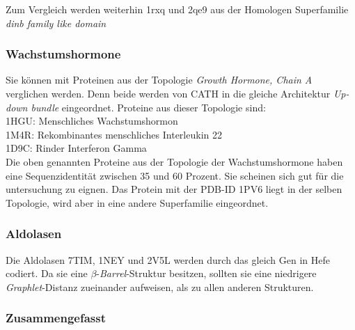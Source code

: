 \documentclass{report}
\begin{document}
Zum Vergleich werden weiterhin 1rxq und 2qe9 aus der Homologen Superfamilie \textit{dinb family like domain}  




\subsubsection{Wachstumshormone}

Sie k\"onnen mit Proteinen aus der Topologie \textit{Growth Hormone, Chain A} verglichen werden. Denn beide werden von CATH in die gleiche Architektur \emph{Up-down bundle} eingeordnet. Proteine aus dieser Topologie sind: \\
1HGU: Menschliches Wachstumshormon\\
1M4R: Rekombinantes menschliches Interleukin 22\\
1D9C: Rinder Interferon Gamma \\
Die oben genannten Proteine aus der Topologie der Wachstumshormone haben eine Sequenzidentit\"at zwischen 35 und 60 Prozent. Sie scheinen sich gut f\"ur die untersuchung zu eignen.
Das Protein mit der PDB-ID 1PV6 liegt in der selben Topologie, wird aber in eine andere Superfamilie eingeordnet.

\subsubsection{Aldolasen}

Die Aldolasen 7TIM, 1NEY und 2V5L werden durch das gleich Gen in Hefe codiert. Da sie eine $\beta$-\textit{Barrel}-Struktur besitzen, sollten sie eine niedrigere \textit{Graphlet}-Distanz zueinander aufweisen, als zu allen anderen Strukturen.

\subsubsection{Zusammengefasst}
\end{document}

